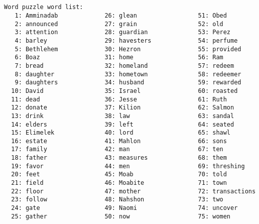 \documentclass[12pt,a4paper,article]{memoir}\usepackage{graphicx, color}
\begin{document}
\begin{verbatim}


Word puzzle word list:
   1: Amminadab             26: glean                 51: Obed
   2: announced             27: grain                 52: old
   3: attention             28: guardian              53: Perez
   4: barley                29: havesters             54: perfume
   5: Bethlehem             30: Hezron                55: provided
   6: Boaz                  31: home                  56: Ram
   7: bread                 32: homeland              57: redeem
   8: daughter              33: hometown              58: redeemer
   9: daughters             34: husband               59: rewarded
  10: David                 35: Israel                60: roasted
  11: dead                  36: Jesse                 61: Ruth
  12: donate                37: Kilion                62: Salmon
  13: drink                 38: law                   63: sandal
  14: elders                39: left                  64: seated
  15: Elimelek              40: lord                  65: shawl
  16: estate                41: Mahlon                66: sons
  17: family                42: man                   67: ten
  18: father                43: measures              68: them
  19: favor                 44: men                   69: threshing
  20: feet                  45: Moab                  70: told
  21: field                 46: Moabite               71: town
  22: floor                 47: mother                72: transactions
  23: follow                48: Nahshon               73: two
  24: gate                  49: Naomi                 74: uncover
  25: gather                50: now                   75: women


\end{verbatim}
\clearpage
\end{document}
